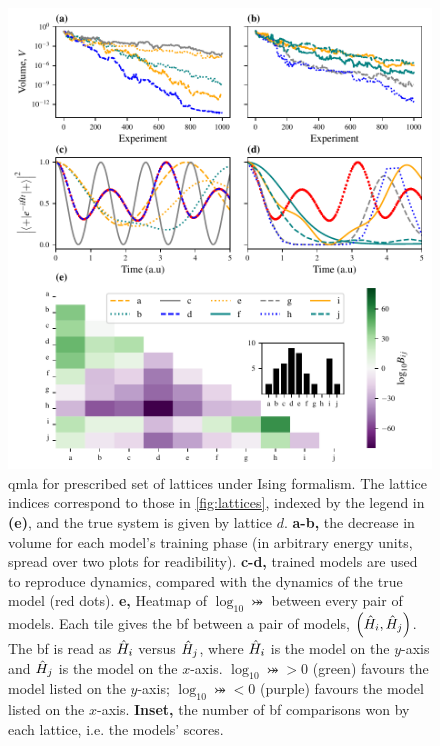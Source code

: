 \begin{figure}
\begin{center}
    \includegraphics{theoretical_study/figures/lattice_qmla_summary.pdf}
\end{center}
\caption[QMLA for prescribed set of lattices under Ising formalism]{
    \gls{qmla} for prescribed set of lattices under Ising formalism. 
    The lattice indices correspond to those in \cref{fig:lattices},
        indexed by the legend in \textbf{(e)},  
        and the true system is given by lattice $d$. 
    \textbf{a-b,} the decrease in \gls{volume} for each model's training phase 
        (in arbitrary energy units, spread over two plots for readibility).
    \textbf{c-d,} trained models are used to reproduce dynamics, compared with the dynamics of the
        \gls{true model} (red dots). 
    \textbf{e,} Heatmap of $\log_{10} \bij$ between every pair of models. 
    Each tile gives the \gls{bf} between a pair of models, $\left(\hat{H}_i, \hat{H}_j\right)$. 
    The \gls{bf} is read as 
    $\hat{H}_i$ versus $\hat{H}_j$, where $\hat{H}_i$ is the model on the $y$-axis and $\hat{H}_j$ is the model on the $x$-axis. 
    $\log_{10} \bij > 0$ (green) favours the model listed on the $y$-axis;
    $\log_{10} \bij < 0$ (purple) favours the model listed on the $x$-axis.
    \textbf{Inset,} the number of \gls{bf} comparisons won by each lattice, i.e. the models' scores. 
    \figtableref
}
\label{fig:lattice_qmla_eg}
\end{figure}    

